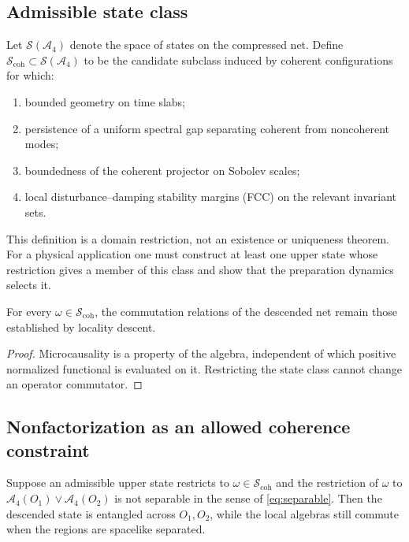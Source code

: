 \documentclass[11pt]{article}
\begin{document}
\subsection{Admissible state class}

\begin{definition}\label{def:Scoh}
Let $\mathcal{S}(\mathcal{A}_4)$ denote the space of states on the compressed
net.  Define
$\mathcal{S}_{\mathrm{coh}}\subset\mathcal{S}(\mathcal{A}_4)$ to be the
candidate subclass induced by coherent configurations for which:
\begin{enumerate}[label=\textup{(\roman*)}]
\item bounded geometry on time slabs;
\item persistence of a uniform spectral gap separating coherent from noncoherent modes;
\item boundedness of the coherent projector on Sobolev scales;
\item local disturbance--damping stability margins (FCC) on the relevant invariant sets.
\end{enumerate}
\end{definition}

This definition is a domain restriction, not an existence or uniqueness
theorem.  For a physical application one must construct at least one upper
state whose restriction gives a member of this class and show that the
preparation dynamics selects it.

\begin{corollary}
\label{prop:locality-preserved}
For every $\omega\in\mathcal{S}_{\mathrm{coh}}$, the commutation relations of
the descended net remain those established by locality descent.
\end{corollary}

\begin{proof}
Microcausality is a property of the algebra, independent of which positive
normalized functional is evaluated on it.  Restricting the state class cannot
change an operator commutator.
\end{proof}

\subsection{Nonfactorization as an allowed coherence constraint}

\begin{proposition}
\label{prop:entanglement-coherence}
Suppose an admissible upper state restricts to
$\omega\in\mathcal S_{\mathrm{coh}}$ and the restriction of $\omega$ to
$\mathcal A_4(O_1)\vee\mathcal A_4(O_2)$ is not separable in the sense of
\eqref{eq:separable}.  Then the descended state is entangled across
$O_1,O_2$, while the local algebras still commute when the regions are
spacelike separated.
\end{proposition}
\end{document}
